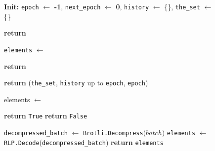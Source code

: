 \begin{figure}[t!]
  \begin{adjustbox}{minipage=[t]{\columnwidth}}
    \begin{algorithm}[H]
      \renewcommand{\thealgorithm}{ABCI Compresschain}         
      \caption{\small }%
      \label{alg:abci-brotli}%
      \small
      \begin{algorithmic}[1]
            \State \textbf{Init:} \texttt{epoch} $\leftarrow$ \textbf{-1}, \texttt{next\_epoch} $\leftarrow$ \textbf{0}, \texttt{history} $\leftarrow$ \{\}, \texttt{the\_set} $\leftarrow$ \{\}

            \label{alg:brotli_check_tx}
                \State \textbf{return} 
            \EndFunction
      
            \label{alg:brotli_deliver_tx}
                \State \texttt{elements} $\leftarrow$ 
                \State {}
            		
            		\State \textbf{return}
            \EndFunction

            \label{alg:van_query}
                \State \textbf{return} (\texttt{the\_set}, \texttt{history} up to \texttt{epoch}, \texttt{epoch})            
             \EndFunction
            
            \label{alg:brotli_is_valid}
            		\State elements $\leftarrow$ 

                    		\State \textbf{return} \texttt{True}
                    \EndIf
                \EndFor
                \State \textbf{return} \texttt{False}
            \EndFunction
            
            \label{alg:brotli_get_element}
                \State \texttt{decompressed\_batch} $\leftarrow$ \texttt{Brotli.Decompress}($batch$)
                \State \texttt{elements} $\leftarrow$ \texttt{RLP.Decode}(\texttt{decompressed\_batch})
                \State \textbf{return} \texttt{elements}
            \EndFunction
            

\end{algorithmic}
\end{algorithm}
\end{adjustbox}
\end{figure}
